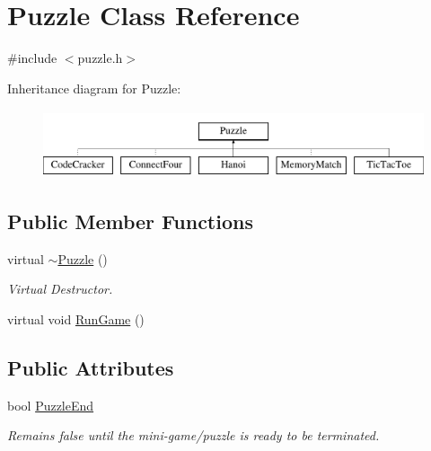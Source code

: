 \hypertarget{classPuzzle}{\section{Puzzle Class Reference}
\label{classPuzzle}
}


{\ttfamily \#include $<$puzzle.\-h$>$}

Inheritance diagram for Puzzle\-:\begin{figure}[H]
\begin{center}
\leavevmode
\includegraphics[height=2.000000cm]{classPuzzle}
\end{center}
\end{figure}
\subsection*{Public Member Functions}
\begin{DoxyCompactItemize}
\item 
\hypertarget{classPuzzle_a4319df1536a07cd1aaf23b27aeb53579}{virtual \hyperlink{classPuzzle_a4319df1536a07cd1aaf23b27aeb53579}{$\sim$\-Puzzle} ()}\label{classPuzzle_a4319df1536a07cd1aaf23b27aeb53579}

\begin{DoxyCompactList}\small\item\em Virtual Destructor. \end{DoxyCompactList}\item 
virtual void \hyperlink{classPuzzle_a0962210916279dc1368b695b399c8ea6}{Run\-Game} ()
\end{DoxyCompactItemize}
\subsection*{Public Attributes}
\begin{DoxyCompactItemize}
\item 
\hypertarget{classPuzzle_a965ad54e9f7340c3cad944fc82c61a2b}{bool \hyperlink{classPuzzle_a965ad54e9f7340c3cad944fc82c61a2b}{Puzzle\-End}}\label{classPuzzle_a965ad54e9f7340c3cad944fc82c61a2b}

\begin{DoxyCompactList}\small\item\em Remains false until the mini-\/game/puzzle is ready to be terminated. \end{DoxyCompactList}\end{DoxyCompactItemize}


